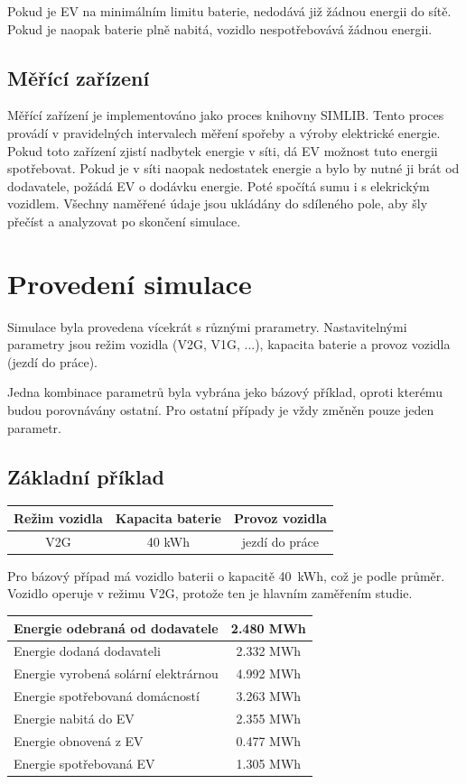 \documentclass[12pt,a4paper]{Cotmas-2018}
\begin{document}
Pokud je EV na minimálním limitu baterie, nedodává již žádnou energii do sítě.
Pokud je naopak baterie plně nabitá, vozidlo nespotřebovává žádnou energii.

\subsection{Měřící zařízení}
Měřící zařízení je implementováno jako proces knihovny SIMLIB.
Tento proces provádí v pravidelných intervalech měření spořeby a výroby elektrické energie.
Pokud toto zařízení zjistí nadbytek energie v síti, dá EV možnost tuto energii spotřebovat.
Pokud je v síti naopak nedostatek energie a bylo by nutné ji brát od dodavatele, požádá EV o dodávku energie.
Poté spočítá sumu i s elekrickým vozidlem.
Všechny naměřené údaje jsou ukládány do sdíleného pole, aby šly přečíst a analyzovat po skončení simulace.

\newpage

\section{Provedení simulace}

Simulace byla provedena vícekrát s různými prarametry.
Nastavitelnými parametry jsou režim vozidla (V2G, V1G, ...), kapacita baterie a provoz vozidla (jezdí do práce).

Jedna kombinace parametrů byla vybrána jeko bázový příklad,
oproti kterému budou porovnávány ostatní.
Pro ostatní případy je vždy změněn pouze jeden parametr.

\subsection{Základní příklad}

\bigskip
\begin{tabular}{ | c | c | c | }
\hline
Režim vozidla & Kapacita baterie & Provoz vozidla \\
\hline
V2G & 40 kWh & jezdí do práce \\
\hline
\end{tabular}
\bigskip

Pro bázový případ má vozidlo baterii o kapacitě 40~kWh, což je podle \textcite{} průměr.
Vozidlo operuje v režimu V2G, protože ten je hlavním zaměřením studie.

\bigskip
\begin{tabular}{ | l | c | }
\hline
Energie odebraná od dodavatele & 2.480 MWh \\
\hline
Energie dodaná dodavateli & 2.332 MWh \\
\hline
Energie vyrobená solární elektrárnou & 4.992 MWh \\
\hline
Energie spotřebovaná domácností & 3.263 MWh \\
\hline
Energie nabitá do EV & 2.355 MWh \\
\hline
Energie obnovená z EV & 0.477 MWh \\
\hline
Energie spotřebovaná EV & 1.305 MWh \\
\hline
\end{tabular}
\bigskip
\end{document}
